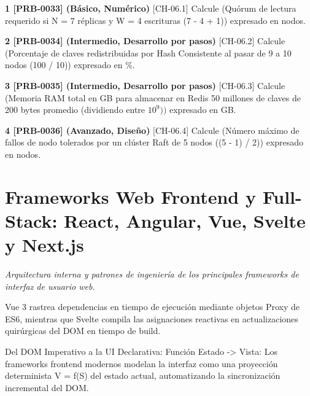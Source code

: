 \documentclass{book}
\begin{document}
\begin{tcolorbox}[title={Ejercicios}, studiumworked, breakable]

\noindent\textbf{1 [PRB-0033] (Básico, Numérico)}
[CH-06.1] Calcule (Quórum de lectura requerido si N = 7 réplicas y W = 4 escrituras (7 - 4 + 1)) expresado en nodos.

\noindent\textbf{2 [PRB-0034] (Intermedio, Desarrollo por pasos)}
[CH-06.2] Calcule (Porcentaje de claves redistribuidas por Hash Consistente al pasar de 9 a 10 nodos (100 / 10)) expresado en \%.

\noindent\textbf{3 [PRB-0035] (Intermedio, Desarrollo por pasos)}
[CH-06.3] Calcule (Memoria RAM total en GB para almacenar en Redis 50 millones de claves de 200 bytes promedio (dividiendo entre \(10^9))\) expresado en GB.

\noindent\textbf{4 [PRB-0036] (Avanzado, Diseño)}
[CH-06.4] Calcule (Número máximo de fallos de nodo tolerados por un clúster Raft de 5 nodos ((5 - 1) / 2)) expresado en nodos.
\end{tcolorbox}

\chapter{Frameworks Web Frontend y Full-Stack: React, Angular, Vue, Svelte y Next.js}
\label{chap:ch-07}

\noindent\textit{Arquitectura interna y patrones de ingeniería de los principales frameworks de interfaz de usuario web.}

\begin{tcolorbox}[title={Consejo}, studiumtip, breakable]

Vue 3 rastrea dependencias en tiempo de ejecución mediante objetos Proxy de ES6, mientras que Svelte compila las asignaciones reactivas en actualizaciones quirúrgicas del DOM en tiempo de build.
\end{tcolorbox}

\begin{tcolorbox}[title={Definición}, studiumdef, breakable]

Del DOM Imperativo a la UI Declarativa: Función Estado -> Vista: Los frameworks frontend modernos modelan la interfaz como una proyección determinista V = f(S) del estado actual, automatizando la sincronización incremental del DOM.
\end{tcolorbox}
\end{document}
